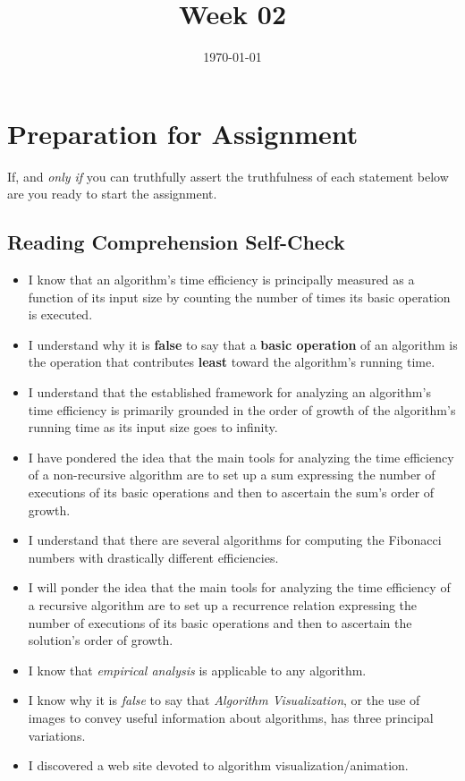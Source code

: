 \documentclass[12pt]{amsart}
\title{Week 02}
\date{\today}
\begin{document}
\maketitle
\section{Preparation for Assignment}
If, and \textit{only if} you can truthfully assert the truthfulness of each statement below are you ready to start the assignment.
\subsection {Reading Comprehension Self-Check}
\begin{itemize}
	\item I know that an algorithm's time efficiency is principally measured as a
    function of its input size by counting the number of times its basic
    operation is executed.
	\item  I understand why it is \textbf{false} to say that a \textbf{basic operation} of an
    algorithm is the operation that contributes \textbf{least} toward the algorithm's
    running time.
	\item I understand that the established framework for analyzing an algorithm's
    time efficiency is primarily grounded in the order of growth of the
    algorithm's running time as its input size goes to infinity.
	\item I have pondered the idea that the main tools for analyzing the time
    efficiency of a non-recursive algorithm are to set up a sum expressing the
    number of executions of its basic operations and then to ascertain the sum's
    order of growth.
	 \item I understand that there are several algorithms for computing the
    Fibonacci numbers with drastically different efficiencies.
  \item I will ponder the idea that the main tools for analyzing the time
    efficiency of a recursive algorithm are to set up a recurrence relation
    expressing the number of executions of its basic operations and then to
    ascertain the solution's order of growth.
  \item I know that \textit{empirical analysis} is applicable to any algorithm.
  \item I know why it is \textit{false} to say that \textit{Algorithm Visualization}, or the
    use of images to convey useful information about algorithms, has three
    principal variations.
  \item I discovered a web site devoted to algorithm visualization/animation.

\end{itemize}
\end{document}
